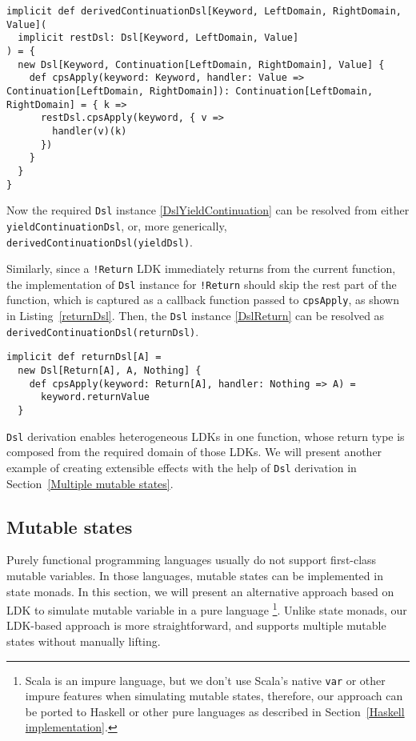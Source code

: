 \begin{lstlisting}[caption={The generic derived \lstinline{Dsl} instance for any LDK, which can be used in a \lstinline{Continuation}},label={derivedContinuationDsl}]
implicit def derivedContinuationDsl[Keyword, LeftDomain, RightDomain, Value](
  implicit restDsl: Dsl[Keyword, LeftDomain, Value]
) = {
  new Dsl[Keyword, Continuation[LeftDomain, RightDomain], Value] {
    def cpsApply(keyword: Keyword, handler: Value => Continuation[LeftDomain, RightDomain]): Continuation[LeftDomain, RightDomain] = { k =>
      restDsl.cpsApply(keyword, { v =>
        handler(v)(k)
      })
    }
  }
}
\end{lstlisting}

Now the required \lstinline{Dsl} instance \ref{DslYieldContinuation} can be resolved from either \lstinline{yieldContinuationDsl}, or, more generically, \lstinline{derivedContinuationDsl(yieldDsl)}.


Similarly, since a \lstinline{!Return} LDK immediately returns from the current function, the implementation of \lstinline{Dsl} instance for \lstinline{!Return} should skip the rest part of the function, which is captured as a callback function passed to \lstinline{cpsApply}, as shown in Listing~\ref{returnDsl}. Then, the \lstinline{Dsl} instance \ref{DslReturn} can be resolved as \lstinline{derivedContinuationDsl(returnDsl)}.

\begin{lstlisting}[caption={The \lstinline{Dsl} instance of \lstinline{Return} LDK, to skip the registered callback function},label={returnDsl}]
implicit def returnDsl[A] =
  new Dsl[Return[A], A, Nothing] {
    def cpsApply(keyword: Return[A], handler: Nothing => A) =
      keyword.returnValue
  }
\end{lstlisting}

\lstinline{Dsl} derivation enables heterogeneous LDKs in one function, whose return type is composed from the required domain of those LDKs. We will present another example of creating extensible effects with the help of \lstinline{Dsl} derivation in Section~\ref{Multiple mutable states}.

\subsection{Mutable states}

Purely functional programming languages usually do not support first-class mutable variables. In those languages, mutable states can be implemented in state monads. In this section, we will present an alternative approach based on LDK to simulate mutable variable in a pure language \footnote{Scala is an impure language, but we don't use Scala's native \lstinline{var} or other impure features when simulating mutable states, therefore, our approach can be ported to Haskell or other pure languages as described in Section~\ref{Haskell implementation}.}. Unlike state monads, our LDK-based approach is more straightforward, and supports multiple mutable states without manually lifting.

